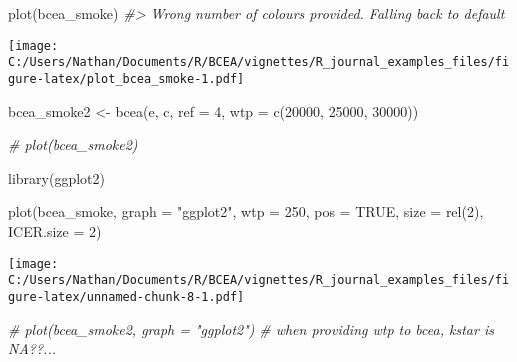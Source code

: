\documentclass[
]{article}
\newenvironment{Shaded}{\begin{snugshade}}{\end{snugshade}}
\newcommand{\AttributeTok}[1]{\textcolor[rgb]{0.77,0.63,0.00}{#1}}
\newcommand{\CommentTok}[1]{\textcolor[rgb]{0.56,0.35,0.01}{\textit{#1}}}
\newcommand{\ConstantTok}[1]{\textcolor[rgb]{0.00,0.00,0.00}{#1}}
\newcommand{\DecValTok}[1]{\textcolor[rgb]{0.00,0.00,0.81}{#1}}
\newcommand{\FunctionTok}[1]{\textcolor[rgb]{0.00,0.00,0.00}{#1}}
\newcommand{\NormalTok}[1]{#1}
\newcommand{\OtherTok}[1]{\textcolor[rgb]{0.56,0.35,0.01}{#1}}
\newcommand{\StringTok}[1]{\textcolor[rgb]{0.31,0.60,0.02}{#1}}
\begin{document}
\begin{Shaded}
\begin{Highlighting}[]
\FunctionTok{plot}\NormalTok{(bcea\_smoke)}
\CommentTok{\#\textgreater{} Wrong number of colours provided. Falling back to default}
\end{Highlighting}
\end{Shaded}

\texttt{[image: C:/Users/Nathan/Documents/R/BCEA/vignettes/R\_journal\_examples\_files/figure-latex/plot\_bcea\_smoke-1.pdf]}

\begin{Shaded}
\begin{Highlighting}[]
\NormalTok{bcea\_smoke2 }\OtherTok{\textless{}{-}} \FunctionTok{bcea}\NormalTok{(e, c, }\AttributeTok{ref =} \DecValTok{4}\NormalTok{, }\AttributeTok{wtp =} \FunctionTok{c}\NormalTok{(}\DecValTok{20000}\NormalTok{, }\DecValTok{25000}\NormalTok{, }\DecValTok{30000}\NormalTok{))}
\end{Highlighting}
\end{Shaded}

\begin{Shaded}
\begin{Highlighting}[]
\CommentTok{\# plot(bcea\_smoke2)}
\end{Highlighting}
\end{Shaded}

\begin{Shaded}
\begin{Highlighting}[]
\FunctionTok{library}\NormalTok{(ggplot2)}

\FunctionTok{plot}\NormalTok{(bcea\_smoke, }\AttributeTok{graph =} \StringTok{"ggplot2"}\NormalTok{, }\AttributeTok{wtp =} \DecValTok{250}\NormalTok{, }\AttributeTok{pos =} \ConstantTok{TRUE}\NormalTok{, }\AttributeTok{size =} \FunctionTok{rel}\NormalTok{(}\DecValTok{2}\NormalTok{), }\AttributeTok{ICER.size =} \DecValTok{2}\NormalTok{)}
\end{Highlighting}
\end{Shaded}

\texttt{[image: C:/Users/Nathan/Documents/R/BCEA/vignettes/R\_journal\_examples\_files/figure-latex/unnamed-chunk-8-1.pdf]}

\begin{Shaded}
\begin{Highlighting}[]
\CommentTok{\# plot(bcea\_smoke2, graph = "ggplot2")}
\CommentTok{\# when providing wtp to bcea, kstar is NA??...}
\end{Highlighting}
\end{Shaded}
\end{document}
